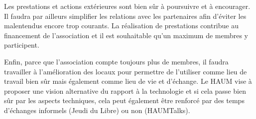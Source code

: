 \documentclass[a4paper, 11pt]{article}
\begin{document}
Les prestations et actions extérieures sont bien sûr à poursuivre et à encourager. Il faudra par ailleurs simplifier les relations avec les partenaires afin d'éviter les malentendus encore trop courants. La réalisation de prestations contribue au financement de l'association et il est souhaitable qu'un maximum de membres y participent.

Enfin, parce que l'association compte toujours plus de membres, il faudra travailler à l'amélioration des locaux pour permettre de l'utiliser comme lieu de travail bien sûr mais également comme lieu de vie et d'échange. Le HAUM vise à proposer une vision alternative du rapport à la technologie et si cela passe bien sûr par les aspects techniques, cela peut également être renforcé par des temps d'échanges informels (Jeudi du Libre) ou non (HAUMTalks).

\newpage




\end{document}
